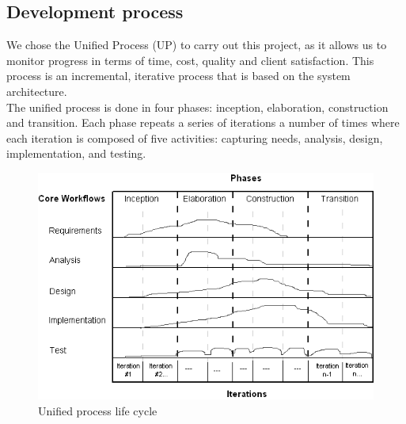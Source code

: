 \subsection{Development process}
We chose the Unified Process (UP) to carry out this project, as it allows us to monitor progress in terms of time, cost, quality and client satisfaction. This process is an incremental, iterative process that is based on the system architecture.\\
The unified process is done in four phases: inception, elaboration, construction and transition. Each phase repeats a series of iterations a number of times where each iteration is composed of five activities: capturing needs, analysis, design, implementation, and testing.
\begin{figure}[H]
\centering
\includegraphics[width=0.7\columnwidth]{Figures/methodo.png}
\caption{Unified process life cycle\cite{methodo}}
\end{figure}
